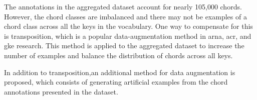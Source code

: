 
The annotations in the aggregated dataset account for nearly
105,000 chords. However, the chord classes are imbalanced
and there may not be examples of a chord class across all
the keys in the vocabulary. One way to compensate for this
is transposition, which is a popular data-augmentation
method in \gls{arna}, \gls{acr}, and \gls{gke} research.
This method is applied to the aggregated dataset to increase
the number of examples and balance the distribution of
chords across all keys.

In addition to transposition,an additional method for data
augmentation is proposed, which consists of generating
artificial examples from the chord annotations presented in
the dataset.
